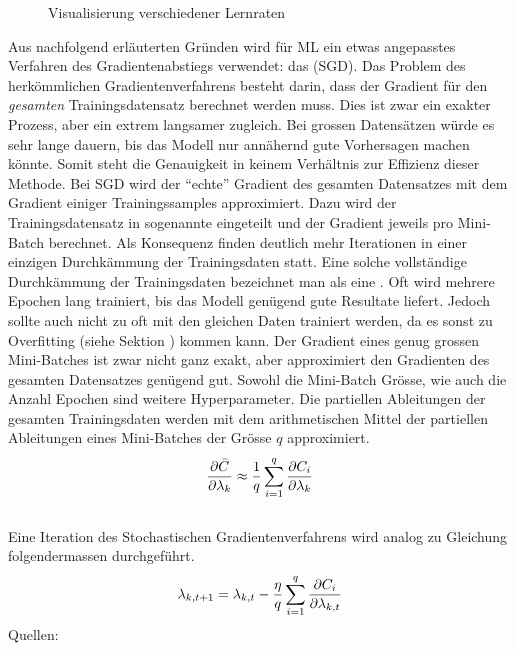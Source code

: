 \begin{figure}[h!]
  \centering
  \caption{Visualisierung verschiedener Lernraten}
\end{figure}

Aus nachfolgend erläuterten Gründen wird für ML ein etwas angepasstes
Verfahren des Gradientenabstiegs verwendet: das  (SGD).
Das Problem des herkömmlichen Gradientenverfahrens besteht darin, dass der
Gradient für den \textit{gesamten} Trainingsdatensatz berechnet werden muss.
Dies ist zwar ein exakter Prozess, aber ein extrem langsamer zugleich.
Bei grossen Datensätzen würde es sehr lange dauern, bis das Modell nur annähernd gute Vorhersagen machen könnte.
Somit steht die Genauigkeit in keinem Verhältnis zur Effizienz dieser Methode.
\para{}
Bei SGD wird der ``echte'' Gradient des gesamten Datensatzes mit dem Gradient einiger Trainingssamples approximiert.
Dazu wird der Trainingsdatensatz in sogenannte  eingeteilt und der Gradient jeweils pro Mini-Batch berechnet.
Als Konsequenz finden deutlich mehr Iterationen in einer einzigen
Durchkämmung der Trainingsdaten statt. Eine solche vollständige Durchkämmung der Trainingsdaten
bezeichnet man als eine .
Oft wird mehrere Epochen lang trainiert, bis das Modell genügend gute Resultate
liefert. Jedoch sollte auch nicht zu oft mit den gleichen Daten trainiert
werden, da es sonst zu Overfitting (siehe Sektion ) kommen kann.
Der Gradient eines genug grossen Mini-Batches ist zwar nicht ganz exakt, aber
approximiert den Gradienten des gesamten Datensatzes genügend gut.
Sowohl die Mini-Batch Grösse, wie auch die Anzahl Epochen sind weitere Hyperparameter.
\para{}
Die partiellen Ableitungen der gesamten Trainingsdaten werden mit dem
arithmetischen Mittel der partiellen Ableitungen eines Mini-Batches der Grösse $q$ approximiert.
\\
\begin{equation}\label{eq:minibatch_deriv}
  \frac{\partial \bar{C}}{\partial \lambda_k} \approx \frac{1}{q}\sum_{i=1}^{q} \frac{\partial C_i}{\partial \lambda_k}
\end{equation}
\\
Eine Iteration des Stochastischen Gradientenverfahrens wird analog zu Gleichung  folgendermassen durchgeführt.
\\
\begin{equation}\label{eq:sgd}
  \lambda_{k,t+1} = \lambda_{k,t} - \frac{\eta}{q} \sum_{i=1}^{q} \frac{\partial C_i}{\partial \lambda_{k,t}}
\end{equation}
\para{}
Quellen: \cite{Nielsen} \cite{book:hands-on}

